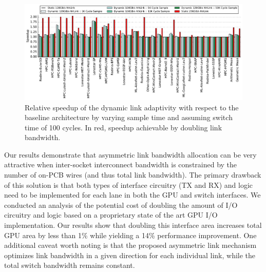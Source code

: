 \begin{figure}[tp]
    \centering
    \includegraphics[width=1.0\textwidth]{figures/plot_nvlink_sample_time.pdf}
    \caption{Relative speedup of the dynamic link adaptivity with respect to
	the baseline architecture by varying sample time and assuming switch 
time of
	100 cycles. In red, speedup achievable by doubling link 
bandwidth.}
    \label{fig:sampletime}
    \vspace{-.2in}
\end{figure}

Our results demonstrate that asymmetric link bandwidth
allocation can be very attractive when inter-socket interconnect bandwidth is constrained 
by the number of on-PCB wires (and thus total link bandwidth).
The primary drawback of this solution is that both types of interface circuitry (TX and RX)
and logic need to be implemented for each lane in both the GPU and switch interfaces.
We conducted an analysis of the potential cost of doubling the amount
of I/O circuitry and logic based on a proprietary state of
the art GPU I/O implementation. Our results show that doubling this interface area
increases total GPU area by less than 1\% while yielding a 14\% performance improvement.  
One additional caveat worth noting is that the proposed asymmetric link
mechanism optimizes link bandwidth in a given direction for each individual
link, while the total switch bandwidth remains constant.
 




